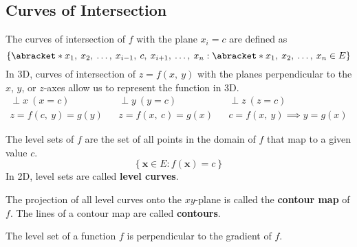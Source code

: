 \documentclass{article}
\begin{document}
\subsection{Curves of Intersection}
\begin{definition}
    The curves of intersection of \(f\) with the plane \(x_i = c\) are defined as
    \begin{equation*}
        \left\{ \abracket*{x_1,\: x_2,\: \ldots,\: x_{i - 1},\: c,\: x_{i + 1},\: \ldots,\: x_n} : \abracket*{x_1,\: x_2,\: \ldots,\: x_n} \in E \right\}
    \end{equation*}
    In 3D, curves of intersection of \(z = f\left( x,\: y \right)\) with the planes perpendicular to the
    \(x\), \(y\), or \(z\)-axes allow us to represent the function in 3D.
    \begin{align*}
        \perp x \: (x = c)                             &  & \perp y \: (y = c)                             &  & \perp z \: (z = c)                                        \\
        z = f\left( c,\: y \right) = g\left( y \right) &  & z = f\left( x,\: c \right) = g\left( x \right) &  & c = f\left( x,\: y \right) \implies y = g\left( x \right)
    \end{align*}
\end{definition}
\begin{definition}
    The level sets of \(f\) are the set of all points in the domain of \(f\) that map to a given value \(c\).
    \begin{equation*}
        \left\{ \symbf{x} \in E : f\left( \symbf{x} \right) = c \right\}
    \end{equation*}
    In 2D, level sets are called \textbf{level curves}.
\end{definition}
\begin{definition}
    The projection of all level curves onto the \(xy\)-plane is called the \textbf{contour map} of \(f\).
    The lines of a contour map are called \textbf{contours}.
\end{definition}
\begin{theorem}
    The level set of a function \(f\) is perpendicular to the gradient
    of \(f\).
\end{theorem}
\end{document}
